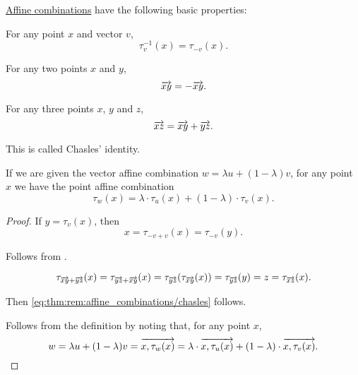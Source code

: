 \begin{proposition}\label{thm:rem:affine_combinations}
  \hyperref[rem:affine_combination]{Affine combinations} have the following basic properties:
  \begin{thmenum}
     For any point \( x \) and vector \( v \),
    \begin{equation*}
      \tau_v^{-1}(x) = \tau_{-v}(x).
    \end{equation*}

     For any two points \( x \) and \( y \),
    \begin{equation*}
      \overrightarrow{xy} = -\overrightarrow{xy}.
    \end{equation*}

     For any three points \( x \), \( y \) and \( z \),
    \begin{equation}\label{eq:thm:rem:affine_combinations/chasles}
      \overrightarrow{xz} = \overrightarrow{xy} + \overrightarrow{yz}.
    \end{equation}

    This is called Chasles' identity.

     If we are given the vector affine combination \( w = \lambda u + (1 - \lambda) v \), for any point \( x \) we have the point affine combination
    \begin{equation*}
      \tau_w(x) = \lambda \cdot \tau_u(x) + (1 - \lambda) \cdot \tau_v(x).
    \end{equation*}
  \end{thmenum}
\end{proposition}
\begin{proof}
   If \( y = \tau_v(x) \), then
  \begin{equation*}
    x = \tau_{-v + v}(x) = \tau_{-v}(y).
  \end{equation*}

   Follows from .

  \begin{equation*}
    \tau_{\overrightarrow{xy} + \overrightarrow{yz}}(x)
    =
    \tau_{\overrightarrow{yz} + \overrightarrow{xy}}(x)
    =
    \tau_{\overrightarrow{yz}}(\tau_{\overrightarrow{xy}}(x))
    =
    \tau_{\overrightarrow{yz}}(y)
    =
    z
    =
    \tau_{\overrightarrow{xz}}(x).
  \end{equation*}

  Then \eqref{eq:thm:rem:affine_combinations/chasles} follows.

   Follows from the definition by noting that, for any point \( x \),
  \begin{equation*}
    w = \lambda u + (1 - \lambda) v
    =
    \overrightarrow{x, \tau_w(x)} = \lambda \cdot \overrightarrow{x, \tau_u(x)} + (1 - \lambda) \cdot \overrightarrow{x, \tau_v(x)}.
  \end{equation*}
\end{proof}

